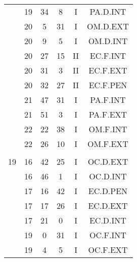 \documentclass[12pt, a4paper]{article}
\begin{document}
\begin{multicols}{3}
{\begin{tabular}{c c c c c c}
	 	 	 	 & 19 & 34 & 8 & I & PA.D.INT\\%
	 	 	 	 & 20 & 5 & 31 & I & OM.D.EXT\\%
	 	 	 	 & 20 & 9 & 5 & I & OM.D.INT\\%
	 	 	 	 & 20 & 27 & 15 & II & EC.F.INT\\%
	 	 	 	 & 20 & 31 & 3 & II & EC.F.EXT\\%
	 	 	 	 & 20 & 32 & 27 & II & EC.F.PEN\\%
	 	 	 	 & 21 & 47 & 31 & I & PA.F.INT\\%
	 	 	 	 & 21 & 51 & 3 & I & PA.F.EXT\\%
	 	 	 	 & 22 & 22 & 38 & I & OM.F.INT\\%
	 	 	 	 & 22 & 26 & 10 & I & OM.F.EXT\\%
	 	 	 	 & & & & & \\%
	 	 	 	19 & 16 & 42 & 25 & I & OC.D.EXT\\%
	 	 	 	 & 16 & 46 & 1 & I & OC.D.INT\\%
	 	 	 	 & 17 & 16 & 42 & I & EC.D.PEN\\%
	 	 	 	 & 17 & 17 & 26 & I & EC.D.EXT\\%
	 	 	 	 & 17 & 21 & 0 & I & EC.D.INT\\%
	 	 	 	 & 19 & 0 & 31 & I & OC.F.INT\\%
	 	 	 	 & 19 & 4 & 5 & I & OC.F.EXT\\%
	 	 \end{tabular}
 	}
\end{multicols}
\end{document}
